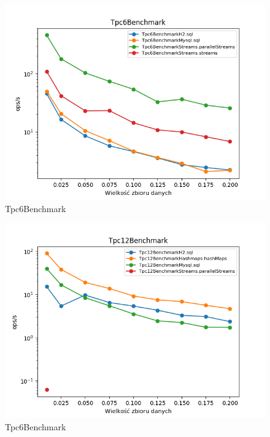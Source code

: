 \documentclass[12pt]{extarticle}
\begin{document}
\begin{figure}[H]
\centering
\includegraphics[width=15cm]{plots/Tpc6Benchmark}
\caption{Tpc6Benchmark}
\end{figure}

\begin{figure}[H]
\centering
\includegraphics[width=15cm]{plots/Tpc12Benchmark}
\caption{Tpc6Benchmark}
\end{figure}
\end{document}
